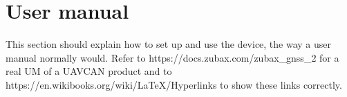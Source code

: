 \chapter{User manual}

This section should explain how to set up and use the device, the way a user manual normally would.
Refer to https://docs.zubax.com/zubax_gnss_2 for a real UM of a UAVCAN product and to https://en.wikibooks.org/wiki/LaTeX/Hyperlinks to show these links correctly.